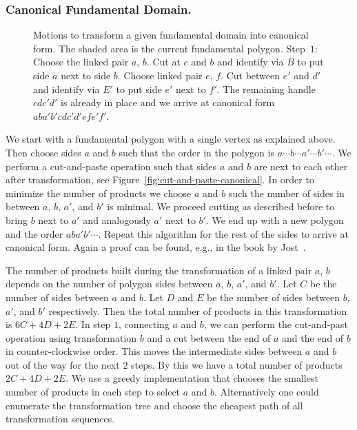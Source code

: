 \documentclass[Thesis]{subfiles}
\begin{document}
\subsubsection*{Canonical Fundamental Domain.}

\begin{figure}
\centering
{}
\caption{Motions to transform a given fundamental domain into canonical form. The shaded area is the current fundamental polygon. Step~$1$: Choose the linked pair $a$, $b$. Cut at $c$ and $b$ and identify via $B$ to put side $a$ next to side $b$. Choose linked pair $e$, $f$. Cut between $e'$ and $d'$ and identify via $E'$ to put side $e'$ next to $f'$. The remaining handle $cdc'd'$ is already in place and we arrive at canonical form $aba'b'cdc'd'efe'f'$.}
\label{fig:canonical_algorithm}
\end{figure}

We start with a fundamental polygon with a single vertex as explained above. 
Then choose sides $a$ and $b$ such that the order in the polygon is $a\cdots b \cdots a' \cdots b' \cdots$. 
We perform a cut-and-paste operation such that sides $a$ and $b$ are next to each other after transformation, see Figure~\ref{fig:cut-and-paste-canonical}. 
In order to minimize the number of products we choose $a$ and $b$ such the number of sides in between $a$, $b$, $a'$, and $b'$ is minimal. 
We proceed cutting as described before to bring $b$ next to $a'$ and analogously $a'$ next to $b'$. 
We end up with a new polygon and the order $aba'b'\cdots$. 
Repeat this algorithm for the rest of the sides to arrive at canonical form. 
Again a proof can be found, e.g., in the book by Jost~\cite[p. 51]{Jost2007}.

The number of products built during the transformation of a linked pair $a$, $b$ depends on the number of polygon sides between $a$, $b$, $a'$, and $b'$. 
Let $C$ be the number of sides between $a$ and $b$. Let $D$ and $E$ be the number of sides between $b$, $a'$, and $b'$ respectively. 
Then the total number of products in this transformation is $6C+4D+2E$. 
In step $1$, connecting $a$ and $b$, we can perform the cut-and-past operation using transformation $b$ and a cut between the end of $a$ and the end of $b$ in counter-clockwise order. 
This moves the intermediate sides between $a$ and $b$ out of the way for the next $2$ steps. 
By this we have a total number of products $2C+4D+2E$. 
We use a greedy implementation that chooses the smallest number of products in each step to select $a$ and $b$.
Alternatively one could enumerate the transformation tree and choose the cheapest path of all transformation sequences.
\end{document}
